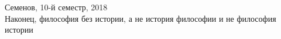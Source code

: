
\usepackage{float}

\begin{titlepage}
\par 
\vspace*{-2cm}
\begin{center}
{\sf \Large
\vspace*{1.5cm}
{\Huge Семенов, 10-й семестр, 2018 }\\
{Наконец, философия без истории, а не история философии и не философия истории}}\\
\vspace*{2cm}

\end{center}
\end{titlepage}
